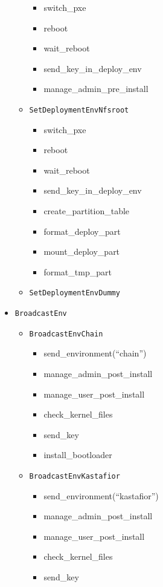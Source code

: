 \documentclass[a4wide,10pt,oneside]{book}
\begin{document}
\begin{itemize}
\begin{itemize}
    \begin{itemize}
    \item switch\_pxe
    \item reboot
    \item wait\_reboot
    \item send\_key\_in\_deploy\_env
    \item manage\_admin\_pre\_install
    \end{itemize}
  \item \texttt{SetDeploymentEnvNfsroot}
    \begin{itemize}
    \item switch\_pxe
    \item reboot
    \item wait\_reboot
    \item send\_key\_in\_deploy\_env
    \item create\_partition\_table
    \item format\_deploy\_part
    \item mount\_deploy\_part
    \item format\_tmp\_part
    \end{itemize}
  \item \texttt{SetDeploymentEnvDummy}
  \end{itemize}
\item \texttt{BroadcastEnv}
  \begin{itemize}
    \item \texttt{BroadcastEnvChain}
      \begin{itemize}
      \item send\_environment(``chain'')
      \item manage\_admin\_post\_install
      \item manage\_user\_post\_install
      \item check\_kernel\_files
      \item send\_key
      \item install\_bootloader
      \end{itemize}
    \item \texttt{BroadcastEnvKastafior}
      \begin{itemize}
      \item send\_environment(``kastafior'')
      \item manage\_admin\_post\_install
      \item manage\_user\_post\_install
      \item check\_kernel\_files
      \item send\_key

\end{itemize}
\end{itemize}
\end{itemize}
\end{document}
